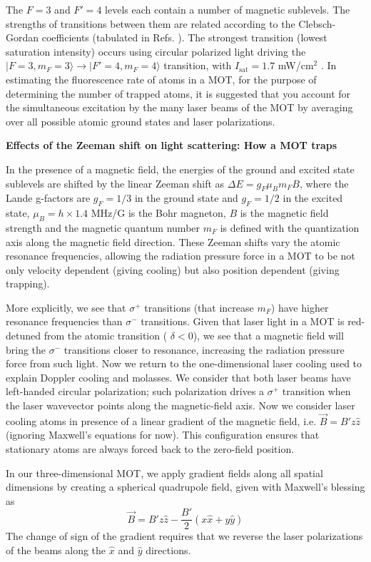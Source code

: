 \documentclass{../lab}
\begin{document}
The $F = 3$ and $F' = 4$ levels each contain a number of magnetic sublevels. The strengths of transitions between them are related according to the Clebsch-Gordan coefficients (tabulated in Refs. \cite{Metcalf,Steck}). The strongest transition (lowest saturation intensity) occurs using circular polarized light driving the $|F = 3, m_F = 3\rangle \rightarrow |F' = 4, m_F = 4\rangle$ transition, with $ I_\text{sat} = 1.7$ mW/cm$^2$ \cite{Steck}. In estimating the fluorescence rate of atoms in a MOT, for the purpose of determining the number of trapped atoms, it is suggested that you account for the simultaneous excitation by the many laser beams of the MOT by averaging over all possible atomic ground states and laser polarizations.

\textbf{Effects of the Zeeman shift on light scattering: How a MOT traps}

In the presence of a magnetic field, the energies of the ground and excited state sublevels are shifted by the linear Zeeman shift as $\Delta E = g_F\mu_Bm_FB$, where the Lande g-factors are $ g_F = 1/3$ in the ground state and $ g_F = 1/2$ in the excited state, $\mu_B = h \times 1.4$ MHz/G is the Bohr magneton, $ B$ is the magnetic field strength and the magnetic quantum number $ m_F$ is defined with the quantization axis along the magnetic field direction. These Zeeman shifts vary the atomic resonance frequencies, allowing the radiation pressure force in a MOT to be not only velocity dependent (giving cooling) but also position dependent (giving trapping).

More explicitly, we see that $\sigma^+$ transitions (that increase $m_F$) have higher resonance frequencies than $\sigma^-$ transitions. Given that laser light in a MOT is red-detuned from the atomic transition ( $\delta <0$), we see that a magnetic field will bring the $\sigma^-$ transitions closer to resonance, increasing the radiation pressure force from such light. Now we return to the one-dimensional laser cooling used to explain Doppler cooling and molasses. We consider that both laser beams have left-handed circular polarization; such polarization drives a $\sigma^+$ transition when the laser wavevector points along the magnetic-field axis. Now we consider laser cooling atoms in presence of a linear gradient of the magnetic field, i.e. $\vec{B} = B'z\hat{z}$ (ignoring Maxwell’s equations for now). This configuration ensures that stationary atoms are always forced back to the zero-field position.

In our three-dimensional MOT, we apply gradient fields along all spatial dimensions by creating a spherical quadrupole field, given with Maxwell’s blessing as
\begin{equation}
    \vec{B} = B'z\hat{z} - \frac{B'}{2}(x\hat{x} + y\hat{y})
\end{equation}
The change of sign of the gradient requires that we reverse the laser polarizations of the beams along the $\hat{x}$ and $\hat{y}$ directions.
\end{document}

